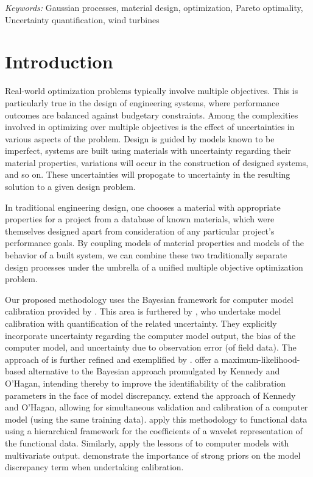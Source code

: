 \documentclass[12pt]{article}
\begin{document}
\noindent%
{\it Keywords:}  Gaussian processes, material design, optimization, Pareto optimality, Uncertainty quantification, wind turbines
\vfill

\newpage
{} %
\section{Introduction}
\label{introduction}

Real-world optimization problems typically involve multiple objectives. 
%
This is particularly true in the design of engineering systems, where performance outcomes are balanced against budgetary constraints. 
%
Among the complexities involved in optimizing over multiple objectives is the effect of uncertainties in various aspects of the problem. 
%
Design is guided by models known to be imperfect, systems are built using materials with uncertainty regarding their material properties, variations will occur in the construction of designed systems, and so on. 
%
These uncertainties will propogate to uncertainty in the resulting solution to a given design problem. 

In traditional engineering design, one chooses a material with appropriate properties for a project from a database of known materials, which were themselves designed apart from consideration of any particular project’s performance goals. 
%
By coupling models of material properties and models of the behavior of a built system, we can combine these two traditionally separate design processes under the umbrella of a unified multiple objective optimization problem.

Our proposed methodology uses the Bayesian framework for computer model calibration provided by  \cite{Kennedy2001}.
% 
This area is furthered by \cite{Higdon2004}, who undertake model calibration with quantification of the related uncertainty. 
They explicitly incorporate uncertainty regarding the computer model output, the bias of the computer model, and uncertainty due to observation error (of field data). 
%
The approach of \cite{Higdon2004} is further refined and exemplified by \cite{Williams2006}.
%
\cite{Loeppky2006} offer a maximum-likelihood-based alternative to the Bayesian approach promulgated by Kennedy and O'Hagan, intending thereby to improve the identifiability of the calibration parameters in the face of model discrepancy. 
%
\cite{Bayarri2007} extend the approach of Kennedy and O'Hagan, allowing for simultaneous validation and calibration of a computer model (using the same training data). 
%
\cite{Bayarri} apply this methodology to functional data using a hierarchical framework for the coefficients of a wavelet representation of the functional data. 
%
Similarly, \cite{Paulo2012} apply the lessons of \cite{Bayarri2007} to computer models with multivariate output.
%
\cite{Brynjarsdottir2014} demonstrate the importance of strong priors on the model discrepancy term when undertaking calibration.
\end{document}
